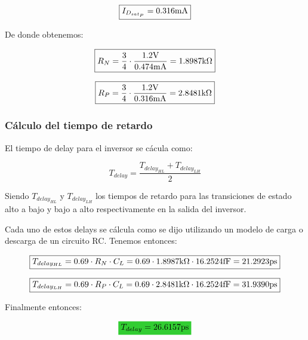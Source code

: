 \begin{equation*}
\boxed{ I_{D_{sat_{P}}} = 0.316 \si[per-mode=symbol]{\milli\ampere} }
\end{equation*}


De donde obtenemos:

\begin{equation*}
\boxed{ R_{N} = \frac{3}{4} \cdot \frac{1.2 \si[per-mode=symbol]{\volt} }{0.474 \si[per-mode=symbol]{\milli\ampere}} = 1.8987 \si[per-mode=symbol]{\kilo\ohm} }
\end{equation*}


\begin{equation*}
\boxed{ R_{P} = \frac{3}{4} \cdot \frac{1.2 \si[per-mode=symbol]{\volt} }{0.316 \si[per-mode=symbol]{\milli\ampere}} = 2.8481 \si[per-mode=symbol]{\kilo\ohm} }
\end{equation*}



\subsubsection{Cálculo del tiempo de retardo}


El tiempo de delay para el inversor se cácula como:

\begin{equation}
T_{delay} = \frac{T_{delay_{HL}} + T_{delay_{LH}}}{2}
\end{equation}


Siendo $T_{delay_{HL}}$ y $T_{delay_{LH}}$ los tiempos de retardo para las transiciones de estado alto a bajo y bajo a alto respectivamente en la salida del inversor.


Cada uno de estos delays se cálcula como se dijo utilizando un modelo de carga o descarga de un circuito RC. Tenemos entonces:


\begin{equation*}
\boxed{ T_{delay_{HL}} = 0.69 \cdot R_{N} \cdot C_{L} = 0.69 \cdot 1.8987 \si[per-mode=symbol]{\kilo\ohm} \cdot 16.2524 \si[per-mode=symbol]{\femto\farad} = 21.2923 \si[per-mode=symbol]{\pico\second} }
\end{equation*}


\begin{equation*}
\boxed{ T_{delay_{LH}} = 0.69 \cdot R_{P} \cdot C_{L} = 0.69 \cdot 2.8481 \si[per-mode=symbol]{\kilo\ohm} \cdot 16.2524 \si[per-mode=symbol]{\femto\farad} = 31.9390 \si[per-mode=symbol]{\pico\second} }
\end{equation*}


Finalmente entonces:



\begin{equation*}
\mathcolorbox{EQColor}{ T_{delay} = 26.6157 \si[per-mode=symbol]{\pico\second} }
\end{equation*}


